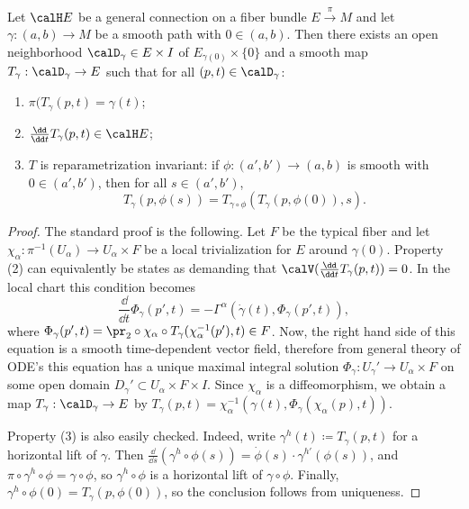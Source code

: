 \begin{thm}\label{prop parallel tra}
    Let $\calH E$ be a general connection on a fiber bundle $E\overset{\pi}{\to}M$ and let $\gamma:(a,b)\to M$ be a smooth path with $0\in(a,b)$. Then there exists an open neighborhood $\calD_\gamma\in E\times I$ of $E_{\gamma(0)}\times\{0\}$ and a smooth map $T_\gamma:\calD_\gamma\to E$ such that for all $(p,t)\in \calD_\gamma$: 
    \begin{enumerate}[label=(\arabic*)]
        \item $\pi(T_\gamma(p,t)=\gamma(t)$;
        \item $\frac{\dd}{\dd t}T_\gamma(p,t)\in \calH E$;
        \item $T$ is reparametrization invariant: if $\phi:(a',b')\to (a,b)$ is smooth with $0\in(a',b')$, then for all $s\in (a',b')$, 
        \[T_\gamma(p,\phi(s))=T_{\gamma\circ\phi}(T_\gamma(p,\phi(0)),s).\]
    \end{enumerate}
\end{thm}
\begin{proof}
    The standard proof is the following. Let $F$ be the typical fiber and let $\chi_\alpha:\pi^{-1}(U_\alpha)\to U_\alpha\times F$ be a local trivialization for $E$ around $\gamma(0)$. Property (2) can equivalently be states as demanding that $\calV(\frac{\dd}{\dd t}T_\gamma(p,t))=0$. In the local chart this condition becomes
    \[\frac{\dd}{\dd t}\Phi_\gamma(p',t)=-\Gamma^\alpha\left(\dot\gamma(t),\Phi_\gamma(p',t)\right),\]
    where $\Phi_\gamma(p',t)=\pr_2\circ \chi_\alpha\circ T_\gamma(\chi_\alpha^{-1}(p'),t)\in F$. Now, the right hand side of this equation is a smooth time-dependent vector field, therefore from general theory of ODE's this equation has a unique maximal integral solution $\Phi_\gamma:U_\gamma'\to U_\alpha\times F$ on some open domain $D_\gamma'\subset U_\alpha\times F\times I$. Since $\chi_\alpha$ is a diffeomorphism, we obtain a map $T_\gamma:\calD_\gamma\to E$ by $T_\gamma(p,t)=\chi_\alpha^{-1}(\gamma(t),\Phi_\gamma(\chi_\alpha(p),t))$.

    Property (3) is also easily checked. Indeed, write $\gamma^h(t)\coloneqq T_\gamma(p,t)$ for a horizontal lift of $\gamma$. Then $\frac{\dd}{\dd s}(\gamma^h\circ \phi(s))=\dot\phi(s)\cdot \gamma^{h\prime}(\phi(s))$, and $\pi\circ\gamma^h\circ\phi=\gamma\circ\phi$, so $\gamma^h\circ\phi$ is a horizontal lift of $\gamma\circ\phi$. Finally, $\gamma^h\circ\phi(0)=T_\gamma(p,\phi(0))$, so the conclusion follows from uniqueness.
\end{proof}


